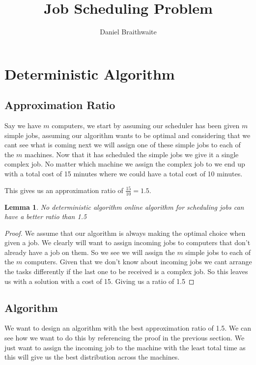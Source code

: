 \documentclass{article}
\title{Job Scheduling Problem}
\author{Daniel Braithwaite}
\newtheorem{lemma}{Lemma}[thm]
\begin{document}
	\maketitle
	\newpage
  			
	\section{Deterministic Algorithm}
		\subsection{Approximation Ratio}
			Say we have $m$ computers, we start by assuming our scheduler has been given $m$ simple jobs, assuming our algorithm wants to be optimal and considering that we cant see what is coming next we will assign one of these simple jobs to each of the $m$ machines. Now that it has scheduled the simple jobs we give it a single complex job. No matter which machine we assign the complex job to we end up with a total cost of 15 minutes where we could have a total cost of 10 minutes.\newline
			
			This gives us an approximation ratio of $\frac{15}{10} = 1.5$.
			
			\begin{lemma}
				No deterministic algorithm online algorithm for scheduling jobs can have a better ratio than 1.5
			\end{lemma}
			
			\begin{proof}
				We assume that our algorithm is always making the optimal choice when given a job. We clearly will want to assign incoming jobs to computers that don't already have a job on them. So we see we will assign the $m$ simple jobs to each of the $m$ computers. Given that we don't know about incoming jobs we cant arrange the tasks differently if the last one to be received is a complex job. So this leaves us with a solution with a cost of 15. Giving us a ratio of 1.5
			\end{proof}
				
		\subsection{Algorithm}
			We want to design an algorithm with the best approximation ratio of 1.5. We can see how we want to do this by referencing the proof in the previous section. We just want to assign the incoming job to the machine with the least total time as this will give us the best distribution across the machines.\newline
		
\end{document}
